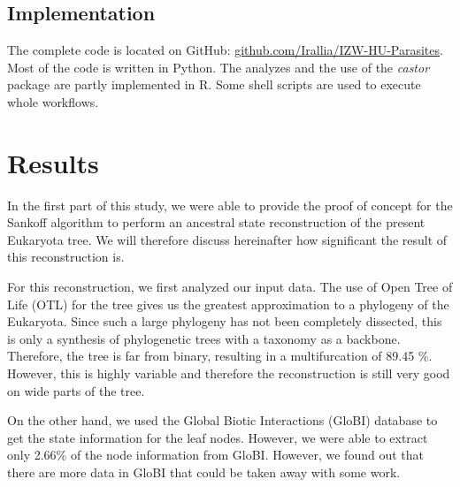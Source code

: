   \section{Implementation}
    The complete code is located on GitHub: 
      \hyperlink{github.com/Irallia/IZW-HU-Parasites}{github.com/Irallia/IZW-HU-Parasites}. \\

    Most of the code is written in Python. The analyzes and the use of the \textit{castor} package 
      are partly implemented in R. Some shell scripts are used to execute whole workflows.

\chapter{Results}
  In the first part of this study, we were able to provide the proof of concept for the Sankoff 
    algorithm to perform an ancestral state reconstruction of the present Eukaryota tree. We will 
    therefore discuss hereinafter how significant the result of this reconstruction is.

  For this reconstruction, we first analyzed our input data. The use of Open Tree of Life (OTL) for
    the tree gives us the greatest approximation to a phylogeny of the Eukaryota. Since such a large
    phylogeny has not been completely dissected, this is only a synthesis of phylogenetic trees with
    a taxonomy as a backbone. Therefore, the tree is far from binary, resulting in a multifurcation 
    of 89.45 \%. However, this is highly variable and therefore the reconstruction is still very 
    good on wide parts of the tree.

  On the other hand, we used the Global Biotic Interactions (GloBI) database to get the state 
    information for the leaf nodes. However, we were able to extract only 2.66\% of the node 
    information from GloBI. However, we found out that there are more data in GloBI that could be 
    taken away with some work.
  
